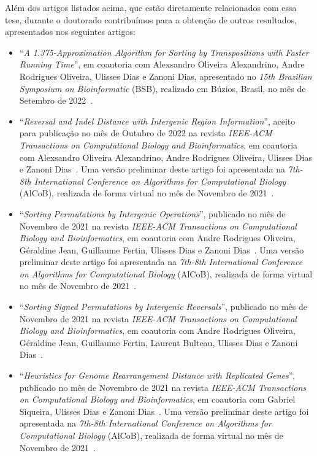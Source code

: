 Além dos artigos listados acima, que estão diretamente relacionados com essa tese, durante o doutorado contribuímos para a obtenção de  outros resultados, apresentados nos seguintes artigos:

\begin{itemize}
  \item ``\textit{A 1.375-Approximation Algorithm for Sorting by Transpositions with Faster Running Time}'', em coautoria com Alexsandro Oliveira Alexandrino, Andre Rodrigues Oliveira, Ulisses Dias e Zanoni Dias, apresentado no \textit{15th Brazilian Symposium on Bioinformatic} (BSB), realizado em Búzios, Brasil, no mês de Setembro de 2022~\cite{2022bsb-alexandrino-etal}.

  \item ``\textit{Reversal and Indel Distance with Intergenic Region Information}'', aceito para publicação no mês de Outubro de 2022 na revista \textit{IEEE-ACM Transactions on Computational Biology and Bioinformatics}, em coautoria com Alexsandro Oliveira Alexandrino, Andre Rodrigues Oliveira, Ulisses Dias e Zanoni Dias~\cite{2022b-alexandrino-etal}. Uma versão preliminar deste artigo foi apresentada na \textit{7th-8th International Conference on Algorithms for Computational Biology} (AlCoB), realizada de forma virtual no mês de Novembro de 2021~\cite{2021b-alexandrino-etal}.

  \item ``\textit{Sorting Permutations by Intergenic Operations}'', publicado no mês de Novembro de 2021 na revista \textit{IEEE-ACM Transactions on Computational Biology and Bioinformatics}, em coautoria com Andre Rodrigues Oliveira, Géraldine Jean, Guillaume Fertin, Ulisses Dias e Zanoni Dias~\cite{2021a-oliveira-etal}. Uma versão preliminar deste artigo foi apresentada na \textit{7th-8th International Conference on Algorithms for Computational Biology} (AlCoB), realizada de forma virtual no mês de Novembro de 2021~\cite{2020-oliveira-etal}.

  \item ``\textit{Sorting Signed Permutations by Intergenic Reversals}'', publicado no mês de Novembro de 2021 na revista \textit{IEEE-ACM Transactions on Computational Biology and Bioinformatics}, em coautoria com Andre Rodrigues Oliveira, Géraldine Jean, Guillaume Fertin, Laurent Bulteau, Ulisses Dias e Zanoni Dias~\cite{2021b-oliveira-etal}.

  \item ``\textit{Heuristics for Genome Rearrangement Distance with Replicated Genes}'', publicado no mês de Novembro de 2021 na revista \textit{IEEE-ACM Transactions on Computational Biology and Bioinformatics}, em coautoria com Gabriel Siqueira, Ulisses Dias e Zanoni Dias~\cite{2021a-siqueira-etal}. Uma versão preliminar deste artigo foi apresentada na \textit{7th-8th International Conference on Algorithms for Computational Biology} (AlCoB), realizada de forma virtual no mês de Novembro de 2021~\cite{2020-siqueira-etal}.


\end{itemize}
